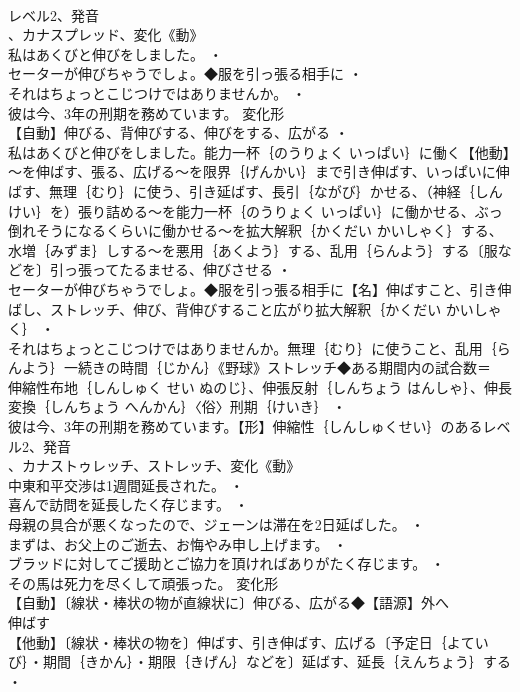 \documentclass[8pt]{extreport}
\begin{document}
\begin{CJK}{UTF8}{min}
\\	レベル2、発音
\\	、カナスプレッド、変化《動》
\\	私はあくびと伸びをしました。 ・
\\	セーターが伸びちゃうでしょ。◆服を引っ張る相手に ・
\\	それはちょっとこじつけではありませんか。 ・
\\	彼は今、3年の刑期を務めています。	変化形 
\\	【自動】伸びる、背伸びする、伸びをする、広がる ・
\\	私はあくびと伸びをしました。能力一杯｛のうりょく いっぱい｝に働く【他動】～を伸ばす、張る、広げる～を限界｛げんかい｝まで引き伸ばす、いっぱいに伸ばす、無理｛むり｝に使う、引き延ばす、長引｛ながび｝かせる、（神経｛しんけい｝を）張り詰める～を能力一杯｛のうりょく いっぱい｝に働かせる、ぶっ倒れそうになるくらいに働かせる～を拡大解釈｛かくだい かいしゃく｝する、水増｛みずま｝しする～を悪用｛あくよう｝する、乱用｛らんよう｝する〔服などを〕引っ張ってたるませる、伸びさせる ・
\\	セーターが伸びちゃうでしょ。◆服を引っ張る相手に【名】伸ばすこと、引き伸ばし、ストレッチ、伸び、背伸びすること広がり拡大解釈｛かくだい かいしゃく｝ ・
\\	それはちょっとこじつけではありませんか。無理｛むり｝に使うこと、乱用｛らんよう｝一続きの時間｛じかん｝《野球》ストレッチ◆ある期間内の試合数＝ 
\\	伸縮性布地｛しんしゅく せい ぬのじ｝、伸張反射｛しんちょう はんしゃ｝、伸長変換｛しんちょう へんかん｝〈俗〉刑期｛けいき｝ ・
\\	彼は今、3年の刑期を務めています。【形】伸縮性｛しんしゅくせい｝のあるレベル2、発音
\\	、カナストゥレッチ、ストレッチ、変化《動》
\\	中東和平交渉は1週間延長された。 ・
\\	喜んで訪問を延長したく存じます。 ・
\\	母親の具合が悪くなったので、ジェーンは滞在を2日延ばした。 ・
\\	まずは、お父上のご逝去、お悔やみ申し上げます。 ・
\\	ブラッドに対してご援助とご協力を頂ければありがたく存じます。 ・
\\	その馬は死力を尽くして頑張った。	変化形 
\\	【自動】〔線状・棒状の物が直線状に〕伸びる、広がる◆【語源】外へ
\\	伸ばす
\\	【他動】〔線状・棒状の物を〕伸ばす、引き伸ばす、広げる〔予定日｛よていび｝・期間｛きかん｝・期限｛きげん｝などを〕延ばす、延長｛えんちょう｝する ・

\end{CJK}
\end{document}
